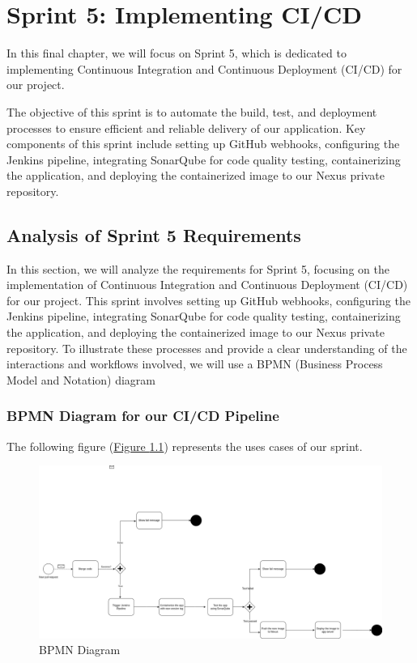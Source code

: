 \chapter{Sprint 5: Implementing CI/CD}
In this final chapter, we will focus on Sprint 5, which is dedicated to implementing Continuous Integration and Continuous Deployment (CI/CD) for our project.

The objective of this sprint is to automate the build, test, and deployment processes to ensure efficient and reliable delivery of our application. Key components of this sprint include setting up GitHub webhooks, configuring the Jenkins pipeline, integrating SonarQube for code quality testing, containerizing the application, and deploying the containerized image to our Nexus private repository.


\pagebreak

\section{Analysis of Sprint 5 Requirements}
In this section, we will analyze the requirements for Sprint 5, focusing on the implementation of Continuous Integration and Continuous Deployment (CI/CD) for our project. This sprint involves setting up GitHub webhooks, configuring the Jenkins pipeline, integrating SonarQube for code quality testing, containerizing the application, and deploying the containerized image to our Nexus private repository. To illustrate these processes and provide a clear understanding of the interactions and workflows involved, we will use a BPMN (Business Process Model and Notation) diagram

\subsection{BPMN Diagram for our CI/CD Pipeline}

The following figure (\hyperref[fig:bpmn]{Figure \ref{fig:bpmn}})  represents the uses cases of our sprint.
\begin{figure}[h]
  \center
  \includegraphics[width=17cm]{./chapters/sprint5/bpmn.png}
  \caption{BPMN Diagram}
  \label{fig:bpmn}
\end{figure}

